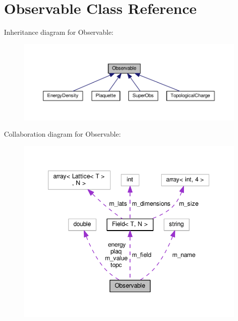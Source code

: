 \hypertarget{classObservable}{}\section{Observable Class Reference}
\label{classObservable}


Inheritance diagram for Observable\+:\nopagebreak
\begin{figure}[H]
\begin{center}
\leavevmode
\includegraphics[width=350pt]{d7/d7e/classObservable__inherit__graph}
\end{center}
\end{figure}


Collaboration diagram for Observable\+:\nopagebreak
\begin{figure}[H]
\begin{center}
\leavevmode
\includegraphics[width=343pt]{df/da6/classObservable__coll__graph}
\end{center}
\end{figure}
